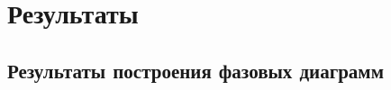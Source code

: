 
\section{Результаты}
\label{PRIMe-SecResults}

\subsection{Результаты построения фазовых диаграмм}
\label{PRIMe-SubSecPhaseDiagramMD}


